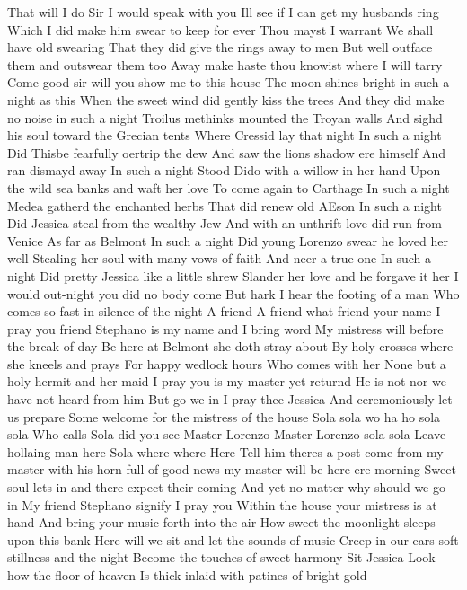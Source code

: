 That will I do 
Sir I would speak with you 
Ill see if I can get my husbands ring 
Which I did make him swear to keep for ever 
Thou mayst I warrant 
We shall have old swearing 
That they did give the rings away to men 
But well outface them and outswear them too 
Away make haste thou knowist where I will tarry 
Come good sir will you show me to this house 
The moon shines bright in such a night as this 
When the sweet wind did gently kiss the trees 
And they did make no noise in such a night 
Troilus methinks mounted the Troyan walls 
And sighd his soul toward the Grecian tents 
Where Cressid lay that night 
In such a night 
Did Thisbe fearfully oertrip the dew 
And saw the lions shadow ere himself 
And ran dismayd away 
In such a night 
Stood Dido with a willow in her hand 
Upon the wild sea banks and waft her love 
To come again to Carthage 
In such a night 
Medea gatherd the enchanted herbs 
That did renew old AEson 
In such a night 
Did Jessica steal from the wealthy Jew 
And with an unthrift love did run from Venice 
As far as Belmont 
In such a night 
Did young Lorenzo swear he loved her well 
Stealing her soul with many vows of faith 
And neer a true one 
In such a night 
Did pretty Jessica like a little shrew 
Slander her love and he forgave it her 
I would out-night you did no body come 
But hark I hear the footing of a man 
Who comes so fast in silence of the night 
A friend 
A friend what friend your name I pray you friend 
Stephano is my name and I bring word 
My mistress will before the break of day 
Be here at Belmont she doth stray about 
By holy crosses where she kneels and prays 
For happy wedlock hours 
Who comes with her 
None but a holy hermit and her maid 
I pray you is my master yet returnd 
He is not nor we have not heard from him 
But go we in I pray thee Jessica 
And ceremoniously let us prepare 
Some welcome for the mistress of the house 
Sola sola wo ha ho sola sola 
Who calls 
Sola did you see Master Lorenzo 
Master Lorenzo sola sola 
Leave hollaing man here 
Sola where where 
Here 
Tell him theres a post come from my master with 
his horn full of good news my master will be here 
ere morning 
Sweet soul lets in and there expect their coming 
And yet no matter why should we go in 
My friend Stephano signify I pray you 
Within the house your mistress is at hand 
And bring your music forth into the air 
How sweet the moonlight sleeps upon this bank 
Here will we sit and let the sounds of music 
Creep in our ears soft stillness and the night 
Become the touches of sweet harmony 
Sit Jessica Look how the floor of heaven 
Is thick inlaid with patines of bright gold 

